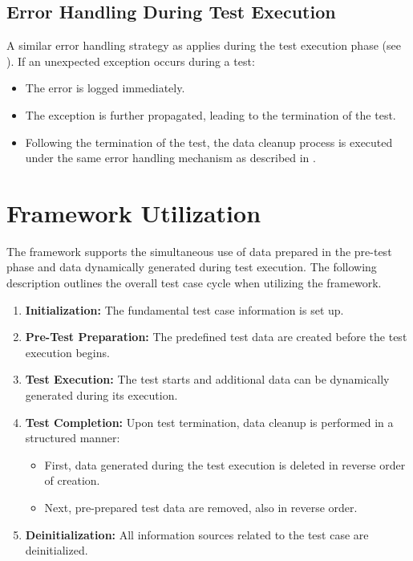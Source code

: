 \subsection{Error Handling During Test Execution}
A similar error handling strategy as  applies during the test execution phase (see ). If an unexpected exception occurs during a test:

\begin{itemize}
    \item The error is logged immediately.
    \item The exception is further propagated, leading to the termination of the test.
    \item Following the termination of the test, the data cleanup process is executed under the same error handling mechanism as described in .
\end{itemize}


\section{Framework Utilization}

The framework supports the simultaneous use of data prepared in the pre-test phase and data dynamically generated during test execution. The following description outlines the overall test case cycle when utilizing the framework.

\begin{enumerate}
    \item \textbf{Initialization:} The fundamental test case information is set up.
    \item \textbf{Pre-Test Preparation:} The predefined test data are created before the test execution begins.
    \item \textbf{Test Execution:} The test starts and additional data can be dynamically generated during its execution.
    \item \textbf{Test Completion:} Upon test termination, data cleanup is performed in a structured manner: \begin{itemize}
        \item First, data generated during the test execution is deleted in reverse order of creation.
        \item Next, pre-prepared test data are removed, also in reverse order.
    \end{itemize}
    \item \textbf{Deinitialization:} All information sources related to the test case are deinitialized.
\end{enumerate}








